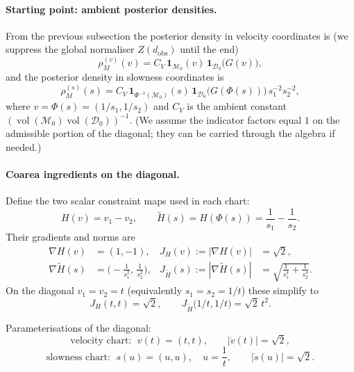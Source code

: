 \documentclass[11pt]{article}
\theoremstyle{remark}
\newcommand{\modelspace}{\mathcal{M}}
\newcommand{\dataspace}{\mathcal{D}}
\begin{document}
\paragraph{Starting point: ambient posterior densities.}
From the previous subsection the posterior density in velocity coordinates is
(we suppress the global normaliser \(Z(d_{\mathrm{obs}})\) until the end)
\begin{equation}\label{eq:rho_v_repeat}
\rho_M^{(v)}(v)
= C_V\,\mathbf{1}_{\modelspace_0}(v)\,\mathbf{1}_{\dataspace_0}\!\bigl(G(v)\bigr),
\end{equation}
and the posterior density in slowness coordinates is
\begin{equation}\label{eq:rho_s_repeat}
\rho_M^{(s)}(s)
= C_V\,\mathbf{1}_{\Phi^{-1}(\modelspace_0)}(s)\,
  \mathbf{1}_{\dataspace_0}\!\bigl(G(\Phi(s))\bigr)\,s_1^{-2}s_2^{-2},
\end{equation}
where \(v=\Phi(s)=(1/s_1,1/s_2)\) and \(C_V\) is the ambient constant
\((\operatorname{vol}(\modelspace_0)\operatorname{vol}(\dataspace_0))^{-1}\).
(We assume the indicator factors equal \(1\) on the admissible portion of the
diagonal; they can be carried through the algebra if needed.)

\paragraph{Coarea ingredients on the diagonal.}
Define the two scalar constraint maps used in each chart:
\[
H(v)=v_1-v_2,\qquad \tilde H(s)=H(\Phi(s))=\frac{1}{s_1}-\frac{1}{s_2}.
\]
Their gradients and norms are
\begin{align}
\nabla H(v) &= (1,-1), & J_H(v):=|\nabla H(v)| &= \sqrt{2}, \label{eq:gradH}\\
\nabla \tilde H(s) &= \Big(-\frac{1}{s_1^2},\,\frac{1}{s_2^2}\Big), &
J_{\tilde H}(s):=|\nabla\tilde H(s)| &= \sqrt{\frac{1}{s_1^4}+\frac{1}{s_2^4}}.
\label{eq:gradHtilde}
\end{align}
On the diagonal \(v_1=v_2=t\) (equivalently \(s_1=s_2=1/t\)) these simplify to
\begin{equation}\label{eq:J_on_diag}
J_H(t,t)=\sqrt{2},\qquad
J_{\tilde H}\!\bigl(1/t,1/t\bigr)=\sqrt{2}\,t^{2}.
\end{equation}

Parameterisations of the diagonal:
\[
\text{velocity chart: } \; v(t)=(t,t),\qquad |\dot v(t)|=\sqrt{2},
\]
\[
\text{slowness chart: } \; s(u)=(u,u),\quad u=\frac{1}{t},\qquad |\dot s(u)|=\sqrt{2}.
\]
\end{document}
